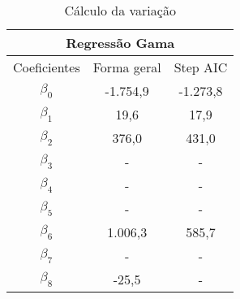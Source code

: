 \documentclass{article}
\begin{document}
\begin{table}[]
	\centering
	\begin{tabular}{ccc}
		\hline
		\multicolumn{3}{c}{\textbf{Regressão Gama}}               \\ \hline
		\multicolumn{1}{l}{Coeficientes} & Forma geral & Step AIC \\ \hline
		$\beta_0$                        & -1.754,9    & -1.273,8 \\
		$\beta_1$                        & 19,6        & 17,9     \\
		$\beta_2$                        & 376,0       & 431,0    \\
		$\beta_3$                        & -           & -        \\
		$\beta_4$                        & -           & -        \\
		$\beta_5$                        & -           & -        \\
		$\beta_6$                        & 1.006,3     & 585,7    \\
		$\beta_7$                        & -           & -        \\
		$\beta_8$                        & -25,5       & -        \\ \hline
	\end{tabular}
	\caption{Cálculo da variação}
	\label{tab:my-table}
\end{table}
\end{document}
